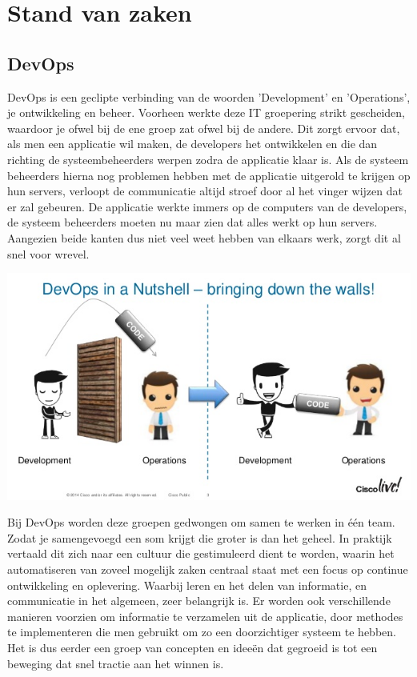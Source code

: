\section{Stand van zaken}
\label{sec:stand-van-zaken}

\subsection{DevOps}
\label{sec:devops-uitleg}
DevOps is een geclipte verbinding van de woorden 'Development' en 'Operations', je ontwikkeling en beheer. Voorheen werkte deze IT groepering strikt gescheiden, waardoor je ofwel bij de ene groep zat ofwel bij de andere. Dit zorgt ervoor dat, als men een applicatie wil maken, de developers het ontwikkelen en die dan richting de systeembeheerders werpen zodra de applicatie klaar is. Als de systeem beheerders hierna nog problemen hebben met de applicatie uitgerold te krijgen op hun servers, verloopt de communicatie altijd stroef door al het vinger wijzen dat er zal gebeuren. De applicatie werkte immers op de computers van de developers, de systeem beheerders moeten nu maar zien dat alles werkt op hun servers. Aangezien beide kanten dus niet veel weet hebben van elkaars werk, zorgt dit al snel voor wrevel.

\begin{center}
	\includegraphics[scale=0.5]{img/devopsmuur.jpg}
\end{center}

Bij DevOps worden deze groepen gedwongen om samen te werken in één team. Zodat je samengevoegd een som krijgt die groter is dan het geheel. In praktijk vertaald dit zich naar een cultuur die gestimuleerd dient te worden, waarin het automatiseren van zoveel mogelijk zaken centraal staat met een focus op continue ontwikkeling en oplevering. Waarbij leren en het delen van informatie, en communicatie in het algemeen, zeer belangrijk is. Er worden ook verschillende manieren voorzien om informatie te verzamelen uit de applicatie, door methodes te implementeren die men gebruikt om zo een doorzichtiger systeem te hebben. Het is dus eerder een groep van concepten en ideeën dat gegroeid is tot een beweging dat snel tractie aan het winnen is.


